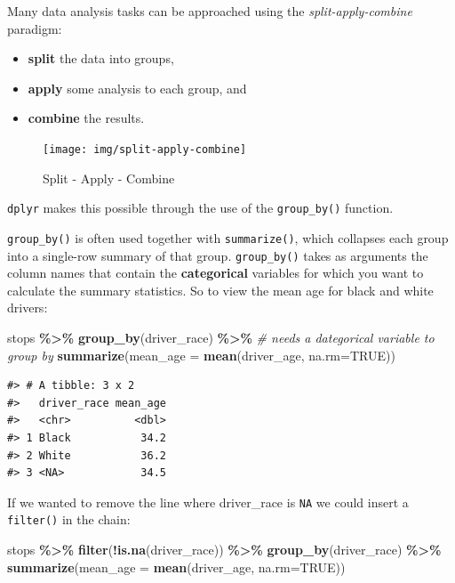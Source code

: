 \documentclass[
]{book}
\newenvironment{Shaded}{\begin{snugshade}}{\end{snugshade}}
\newcommand{\AttributeTok}[1]{\textcolor[rgb]{0.13,0.29,0.53}{#1}}
\newcommand{\CommentTok}[1]{\textcolor[rgb]{0.56,0.35,0.01}{\textit{#1}}}
\newcommand{\ConstantTok}[1]{\textcolor[rgb]{0.56,0.35,0.01}{#1}}
\newcommand{\FunctionTok}[1]{\textcolor[rgb]{0.13,0.29,0.53}{\textbf{#1}}}
\newcommand{\NormalTok}[1]{#1}
\newcommand{\SpecialCharTok}[1]{\textcolor[rgb]{0.81,0.36,0.00}{\textbf{#1}}}
\providecommand{\tightlist}{%
  \setlength{\itemsep}{0pt}\setlength{\parskip}{0pt}}
\begin{document}
Many data analysis tasks can be approached using the \emph{split-apply-combine}
paradigm:

\begin{itemize}
\tightlist
\item
  \textbf{split} the data into groups,
\item
  \textbf{apply} some analysis to each group, and
\item
  \textbf{combine} the results.
\end{itemize}

\begin{figure}
\texttt{[image: img/split-apply-combine]} \caption{Split - Apply - Combine}\label{fig:split-apply-combine}
\end{figure}

\texttt{dplyr} makes this possible through the use of the \texttt{group\_by()} function.

\texttt{group\_by()} is often used together with \texttt{summarize()}, which collapses each
group into a single-row summary of that group. \texttt{group\_by()} takes as arguments
the column names that contain the \textbf{categorical} variables for which you want
to calculate the summary statistics. So to view the mean age for black and white drivers:

\begin{Shaded}
\begin{Highlighting}[]
\NormalTok{stops }\SpecialCharTok{\%\textgreater{}\%}
  \FunctionTok{group\_by}\NormalTok{(driver\_race) }\SpecialCharTok{\%\textgreater{}\%} \CommentTok{\# needs a dategorical variable to group by}
  \FunctionTok{summarize}\NormalTok{(}\AttributeTok{mean\_age =} \FunctionTok{mean}\NormalTok{(driver\_age, }\AttributeTok{na.rm=}\ConstantTok{TRUE}\NormalTok{))}
\end{Highlighting}
\end{Shaded}

\begin{verbatim}
#> # A tibble: 3 x 2
#>   driver_race mean_age
#>   <chr>          <dbl>
#> 1 Black           34.2
#> 2 White           36.2
#> 3 <NA>            34.5
\end{verbatim}

If we wanted to remove the line where driver\_race is \texttt{NA} we could insert a \texttt{filter()} in the chain:

\begin{Shaded}
\begin{Highlighting}[]
\NormalTok{stops }\SpecialCharTok{\%\textgreater{}\%}
  \FunctionTok{filter}\NormalTok{(}\SpecialCharTok{!}\FunctionTok{is.na}\NormalTok{(driver\_race)) }\SpecialCharTok{\%\textgreater{}\%} 
  \FunctionTok{group\_by}\NormalTok{(driver\_race) }\SpecialCharTok{\%\textgreater{}\%}
  \FunctionTok{summarize}\NormalTok{(}\AttributeTok{mean\_age =} \FunctionTok{mean}\NormalTok{(driver\_age, }\AttributeTok{na.rm=}\ConstantTok{TRUE}\NormalTok{))}
\end{Highlighting}
\end{Shaded}
\end{document}
